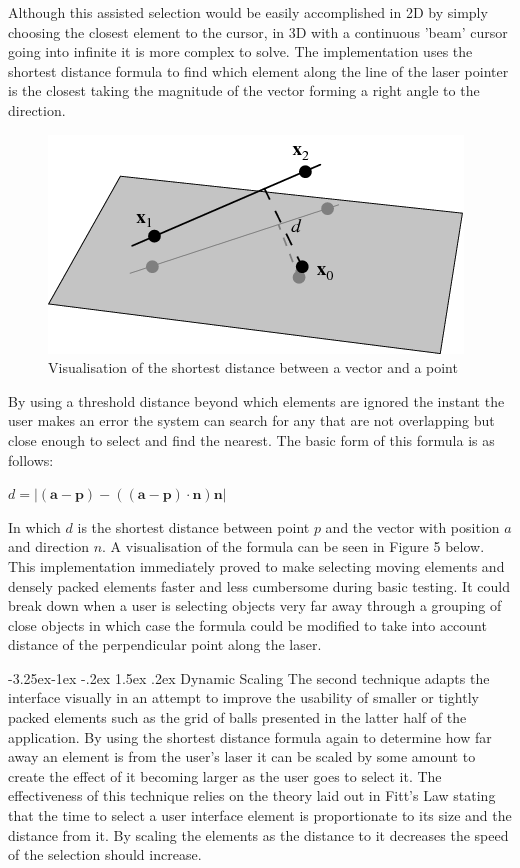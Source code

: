\documentclass[12pt]{article}
\makeatletter
\renewcommand{\subsubsection}{\@startsection{subsubsection}{2}{\z@}%
             {-3.25ex\@plus -1ex \@minus -.2ex}%
             {1.5ex \@plus .2ex}%
             {\normalfont\normalsize\scshape\bfseries}}
\makeatother
\begin{document}
Although this assisted selection would be easily accomplished in 2D by simply choosing the closest element to the cursor, in 3D with a continuous 'beam' cursor going into infinite it is more complex to solve. The implementation uses the shortest distance formula to find which element along the line of the laser pointer is the closest taking the magnitude of the vector forming a right angle to the direction.

\begin{figure}
\centering
  \includegraphics[width=.8\linewidth]{nearestpoint.png}
  \caption{Visualisation of the shortest distance between a vector and a point}
\end{figure}

By using a threshold distance beyond which elements are ignored the instant the user makes an error the system can search for any that are not overlapping but close enough to select and find the nearest. The basic form of this formula is as follows: 

$d = |(\mathbf{a}-\mathbf{p}) - ((\mathbf{a}-\mathbf{p}) \cdot  \mathbf{n})\mathbf{n}|$

In which $d$ is the shortest distance between point $p$ and the vector with position $a$ and direction $n$. A visualisation of the formula can be seen in Figure 5 below. This implementation immediately proved to make selecting moving elements and densely packed elements faster and less cumbersome during basic testing. It could break down when a user is selecting objects very far away through a grouping of close objects in which case the formula could be modified to take into account distance of the perpendicular point along the laser.

\subsubsection{Dynamic Scaling}
The second technique adapts the interface visually in an attempt to improve the usability of smaller or tightly packed elements such as the grid of balls presented in the latter half of the application. By using the shortest distance formula again to determine how far away an element is from the user's laser it can be scaled by some amount to create the effect of it becoming larger as the user goes to select it. The effectiveness of this technique relies on the theory laid out in Fitt's Law stating that the time to select a user interface element is proportionate to its size and the distance from it. By scaling the elements as the distance to it decreases the speed of the selection should increase.
\end{document}
